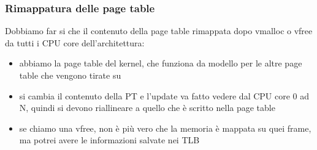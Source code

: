 \documentclass[12pt, oneside]{extbook}
\begin{document}
\subsubsection{Rimappatura delle page table}
Dobbiamo far si che il contenuto della page table rimappata dopo vmalloc o vfree da tutti i CPU core dell'architettura:
\begin{itemize}
\item abbiamo la page table del kernel, che funziona da modello per le altre page table che vengono tirate su
\item si cambia il contenuto della PT e l'update va fatto vedere dal CPU core 0 ad N, quindi si devono riallineare a quello che è scritto nella page table
\item se chiamo una vfree, non è più vero che la memoria è mappata su quei frame, ma potrei avere le informazioni salvate nei TLB
\end{itemize}
\end{document}
